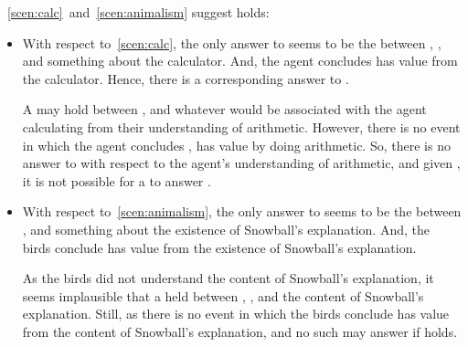 \begin{note}
  ~\ref{scen:calc}~and~\ref{scen:animalism} suggest \issueInclusion{} holds:%
  \begin{itemize}[noitemsep]
  \item
    With respect to~\autoref{scen:calc}, the only answer to \qWhy{} seems to be the \ros{} between \propM{\gistCalcEq{}}, , and something about the calculator.
    And, the agent concludes \propM{\gistCalcEq{}} has value  from the calculator.
    Hence, there is a corresponding answer to \qHow{}.

    A \ros{} may hold between \propM{\gistCalcEq{}},  and whatever \pool{} would be associated with the agent calculating \gistCalcEq{} from their understanding of arithmetic.
    However, there is no event in which the agent concludes \propM{\gistCalcEq{}}, has value  by doing arithmetic.
    So, there is no answer to \qHow{} with respect to the agent's understanding of arithmetic, and given \issueInclusion{}, it is not possible for a \ros{} to answer \qWhy{}.
  \item
    With respect to~\autoref{scen:animalism}, the only answer to \qWhy{} seems to be the \ros{} between ,  and something about the existence of Snowball's explanation.
    And, the birds conclude  has value  from the existence of Snowball's explanation.

    As the birds did not understand the content of Snowball's explanation, it seems implausible that a \ros{} held between , , and the content of Snowball's explanation.
    Still, as there is no event in which the birds conclude  has value  from the content of Snowball's explanation, and no such \ros{} may answer \qWhy{} if \issueInclusion{} holds.
  \end{itemize}
\end{note}

